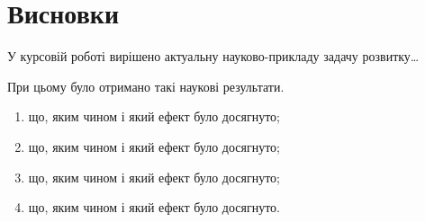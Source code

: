 \chapter*{Висновки}\label{ch:04}

У курсовій роботі вирішено актуальну науково-прикладу задачу розвитку\ldots

При цьому було отримано такі наукові результати.
\begin{enumerate}
 \item що, яким чином і який ефект було досягнуто;
 \item що, яким чином і який ефект було досягнуто;
 \item що, яким чином і який ефект було досягнуто;
 \item що, яким чином і який ефект було досягнуто.
\end{enumerate}